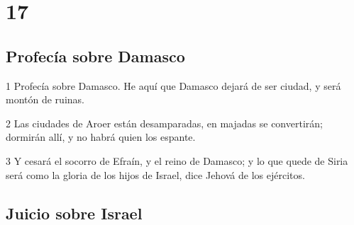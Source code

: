 \chapter{17}

\section*{Profecía sobre Damasco}

\par 1 Profecía sobre Damasco. He aquí que Damasco dejará de ser ciudad, y será montón de ruinas.
\par 2 Las ciudades de Aroer están desamparadas, en majadas se convertirán; dormirán allí, y no habrá quien los espante.
\par 3 Y cesará el socorro de Efraín, y el reino de Damasco; y lo que quede de Siria será como la gloria de los hijos de Israel, dice Jehová de los ejércitos.

\section*{Juicio sobre Israel}

